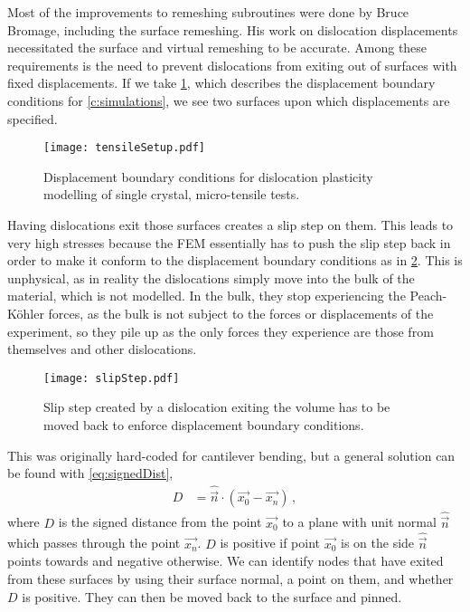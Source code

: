 Most of the improvements to remeshing subroutines were done by Bruce Bromage, including the surface remeshing. His work on dislocation displacements necessitated the surface and virtual remeshing to be accurate. Among these requirements is the need to prevent dislocations from exiting out of surfaces with fixed displacements. If we take \cref{f:tensileSetupTop}, which describes the displacement boundary conditions for \cref{c:simulations}, we see two surfaces upon which displacements are specified.
\begin{figure}
    \centering
    \texttt{[image: tensileSetup.pdf]}
    \caption[Displacement boundary conditions for dislocation plasticity modelling of single crystal, micro-tensile tests.]{Displacement boundary conditions for dislocation plasticity modelling of single crystal, micro-tensile tests.}
    \label{f:tensileSetupTop}
\end{figure}
Having dislocations exit those surfaces creates a slip step on them. This leads to very high stresses because the FEM essentially has to push the slip step back in order to make it conform to the displacement boundary conditions as in \cref{f:slipStep}. This is unphysical, as in reality the dislocations simply move into the bulk of the material, which is not modelled. In the bulk, they stop experiencing the Peach-K\"{o}hler forces, as the bulk is not subject to the forces or displacements of the experiment, so they pile up as the only forces they experience are those from themselves and other dislocations.
\begin{figure}
    \centering
    \texttt{[image: slipStep.pdf]}
    \caption{Slip step created by a dislocation exiting the volume has to be moved back to enforce displacement boundary conditions.}
    \label{f:slipStep}
\end{figure}

This was originally hard-coded for cantilever bending, but a general solution can be found with \cref{eq:signedDist},
\begin{align}\label{eq:signedDist}
    D & = \hat{\vec{n}} \cdot (\vec{x_0} - \vec{x_n})\,,
\end{align}
where $D$ is the signed distance from the point $\vec{x_0}$ to a plane with unit normal $\hat{\vec{n}}$ which passes through the point $\vec{x_n}$. $D$ is positive if point $\vec{x_0}$ is on the side $\hat{\vec{n}}$ points towards and negative otherwise. We can identify nodes that have exited from these surfaces by using their surface normal, a point on them, and whether $D$ is positive. They can then be moved back to the surface and pinned.

